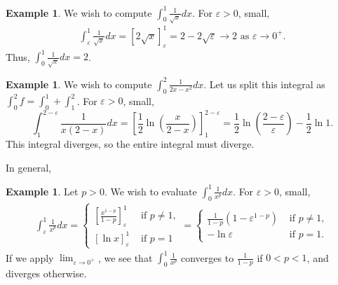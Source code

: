 \documentclass[15pt,a4paper]{book}
\theoremstyle{definition}
\newtheorem{example}[theorem]{Example}
\begin{document}
\begin{example}
    We wish to compute $\int_{0}^{1} \frac{1}{\sqrt{x}} dx$. For $\varepsilon > 0$, small,
    \begin{align}
        \int_{\varepsilon}^{1} \frac{1}{\sqrt{x}} dx = \left[ 2\sqrt{x} \right]_{\varepsilon}^{1} = 2-2\sqrt{\varepsilon} \to 2 \text{ as } \varepsilon \to 0^{+}.
    \end{align}
    Thus, $\int_{0}^{1} \frac{1}{\sqrt{x}} dx = 2$.
\end{example}

\begin{example}
    We wish to compute $\int_{0}^{2} \frac{1}{2x-x^{2}} dx$. Let us split this integral as $\int_{0}^{2} f = \int_{0}^{1} + \int_{1}^{2}$. For $\varepsilon > 0$, small,
    \begin{equation}
        \int_{1}^{2-\varepsilon} \frac{1}{x(2-x)}dx = \left[ \frac{1}{2} \ln \left( \frac{x}{2-x} \right) \right]_{1}^{2-\varepsilon} = \frac{1}{2} \ln \left( \frac{2-\varepsilon}{\varepsilon} \right) - \frac{1}{2} \ln 1.
    \end{equation}
    This integral diverges, so the entire integral must diverge.
\end{example}

In general,
\begin{example}
    Let $p > 0$. We wish to evaluate $\int_{0}^{1} \frac{1}{x^{p}} dx$. For $\varepsilon > 0$, small,
    \begin{align}
        \int_{\varepsilon}^{1} \frac{1}{x^{p}} dx = \begin{cases}
            \left[ \frac{x^{1-p}}{1-p} \right]_{\varepsilon}^{1} &\text{ if } p \neq 1, \\
            \left[ \ln x \right]_{\varepsilon}^{1} &\text{ if } p = 1
        \end{cases} = \begin{cases}
            \frac{1}{1-p}(1-\varepsilon^{1-p}) &\text{ if } p \neq 1, \\
            - \ln \varepsilon &\text{ if } p = 1.
        \end{cases}
    \end{align}
    If we apply $\lim_{\varepsilon \to 0^{+}}$, we see that $\int_{0}^{1} \frac{1}{x^{p}}$ converges to $\frac{1}{1-p}$ if $0 < p < 1$, and diverges otherwise.
\end{example}
\end{document}

